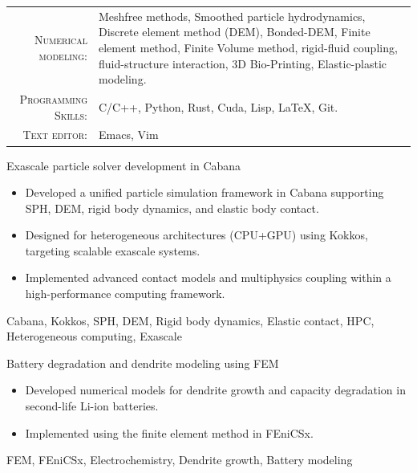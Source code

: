 \documentclass[localFont]{awesome-source-cv}
\begin{document}
{  %
  \renewcommand{\arraystretch}{1.1}

  \begin{tabular}{>{}r>{}p{13cm}}
    \textsc{Numerical modeling:} & Meshfree methods, Smoothed particle hydrodynamics,
                                   Discrete element method (DEM), Bonded-DEM,
                                   Finite element method,
                                   Finite Volume method,
                                   rigid-fluid coupling,
                                   fluid-structure interaction,
                                   3D Bio-Printing,
                                   Elastic-plastic modeling.\\
    \textsc{Programming Skills:}    &  C/C++, Python, Rust, Cuda, Lisp, \LaTeX, Git.\\
    \textsc{Text editor:}    &  Emacs, Vim
  \end{tabular}

  \begin{experiences}

    \experience
    {} {Exascale particle solver development in Cabana}{}{}
    {} {
      \begin{itemize}
      \item Developed a unified particle simulation framework in Cabana supporting SPH, DEM, rigid body dynamics, and elastic body contact.
      \item Designed for heterogeneous architectures (CPU+GPU) using Kokkos, targeting scalable exascale systems.
      \item Implemented advanced contact models and multiphysics coupling within a high-performance computing framework.
      \end{itemize}
    }
    {Cabana, Kokkos, SPH, DEM, Rigid body dynamics, Elastic contact, HPC, Heterogeneous computing, Exascale}

    \experience
    {} {Battery degradation and dendrite modeling using FEM}{}{}
    {} {
      \begin{itemize}
      \item Developed numerical models for dendrite growth and capacity degradation in second-life Li-ion batteries.
      \item Implemented using the finite element method in FEniCSx.
      \end{itemize}
    }
    {FEM, FEniCSx, Electrochemistry, Dendrite growth, Battery modeling}


\end{experiences}}
\end{document}
